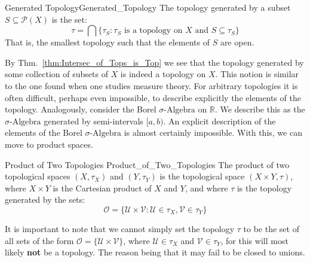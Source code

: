     \begin{ldefinition}{Generated Topology}{Generated_Topology}
        The topology generated by a subset $S\subseteq\mathcal{P}(X)$
        is the set:
        \begin{equation}
            \tau=\bigcap\{\tau_{S}:\tau_{S}
                \textrm{ is a topology on $X$ and }
                S\subseteq\tau_{S}\}
        \end{equation}
        That is, the smallest topology such that the elements of $S$
        are open.
    \end{ldefinition}
    By Thm.~\ref{thm:Intersec_of_Tops_is_Top} we see
    that the topology generated by some collection of subsets of
    $X$ is indeed a topology on $X$. This notion is similar to
    the one found when one studies measure theory. For
    arbitrary topologies it is often difficult, perhaps
    even impossible, to describe explicitly the elements of the
    topology. Analogously, consider the Borel
    $\sigma\textrm{-Algebra}$ on $\mathbb{R}$. We describe
    this as the $\sigma\textrm{-Algebra}$ generated by
    semi-intervals $[a,b)$. An explicit description of the elements
    of the Borel $\sigma\textrm{-Algebra}$ is almost certainly
    impossible. With this, we can move to product spaces.
    \begin{ldefinition}{Product of Two Topologies}
          {Product_of_Two_Topologies}
        The product of two topological spaces $(X,\tau_{X})$ and
        $(Y,\tau_{Y})$ is the topological space $(X\times{Y},\tau)$,
        where $X\times{Y}$ is the Cartesian product of $X$ and $Y$,
        and where $\tau$ is the topology generated by the sets:
        \begin{equation}
            \mathcal{O}=\big\{\mathcal{U}\times\mathcal{V}:
                \mathcal{U}\in\tau_{X},\mathcal{V}\in\tau_{Y}\big\}
        \end{equation}
    \end{ldefinition}
    It is important to note that we cannot simply set the topology
    $\tau$ to be the set of all sets of the form
    $\mathcal{O}=\big\{\mathcal{U}\times\mathcal{V}\big\}$, where
    $\mathcal{U}\in\tau_{X}$ and $\mathcal{V}\in\tau_{Y}$, for
    this will most likely \textbf{not} be a topology.
    The reason being that it may fail to be closed to unions.
